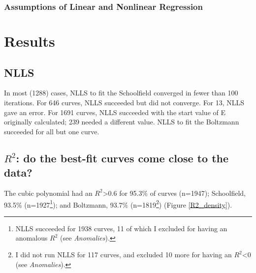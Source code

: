\documentclass[11pt]{article}
\begin{document}
\subsubsection*{Assumptions of Linear and Nonlinear Regression}

\section*{Results}


\subsection*{NLLS}


In most (1288) cases, NLLS to fit the Schoolfield converged in fewer than 100 iterations. For 646 curves, NLLS succeeded but did not converge. %
For 13, NLLS gave an error. %
For 1691 curves, NLLS succeeded with the start value of E originally calculated; 239 needed a different value. %
NLLS to fit the Boltzmann succeeded for all but one curve.

\subsection*{$R^{2}$: do the best-fit curves come close to the data?}
The cubic polynomial had an $R^{2}$\textgreater 0.6 for 95.3\% of curves (n=1947); Schoolfield, 93.5\% (n=1927\footnote{NLLS succeeded for 1938 curves, 11 of which I excluded for having an anomalous $R^{2}$ (see \textit{Anomalies}).}); and Boltzmann, 93.7\% (n=1819\footnote{I did not run NLLS for 117 curves, and excluded 10 more for having an $R^{2}$\textless 0 (see \textit{Anomalies}).}) (Figure \ref{R2_density}).
\end{document}
